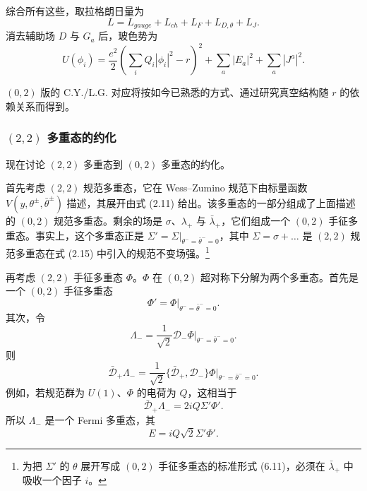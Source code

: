综合所有这些，取拉格朗日量为
\begin{equation}
L=L_{gauge}+L_{ch}+L_F+L_{D,\theta}+L_J.\tag{6.26}
\end{equation}
消去辅助场 $D$ 与 $G_a$ 后，玻色势为
\begin{equation} U(\phi_i)=\frac{e^2}{2}\left(\sum_iQ_i|\phi_i|^2-r\right)^2+\sum_a|E_a|^2+\sum_a|J^a|^2.\tag{6.27}
\end{equation}


$(0,2)$ 版的 C.Y./L.G. 对应将按如今已熟悉的方式、通过研究真空结构随 $r$ 的依赖关系而得到。

\subsubsection*{$(2,2)$ 多重态的约化}

现在讨论 $(2,2)$ 多重态到 $(0,2)$ 多重态的约化。

首先考虑 $(2,2)$ 规范多重态，它在 Wess--Zumino 规范下由标量函数 $V(y,\theta^\pm,\bar\theta^\pm)$ 描述，其展开由式 (2.11) 给出。该多重态的一部分组成了上面描述的 $(0,2)$ 规范多重态。剩余的场是 $\sigma$、$\lambda_+$ 与 $\bar\lambda_+$，它们组成一个 $(0,2)$ 手征多重态。事实上，这个多重态正是 $\Sigma'=\Sigma|_{\theta^-=\bar\theta^-=0}$，其中 $\Sigma=\sigma+\ldots$ 是 $(2,2)$ 规范多重态在式 (2.15) 中引入的规范不变场强。\footnote{为把 $\Sigma'$ 的 $\theta$ 展开写成 $(0,2)$ 手征多重态的标准形式 (6.11)，必须在 $\bar\lambda_+$ 中吸收一个因子 $i$。}

再考虑 $(2,2)$ 手征多重态 $\Phi$。$\Phi$ 在 $(0,2)$ 超对称下分解为两个多重态。首先是一个 $(0,2)$ 手征多重态
\begin{equation}
\Phi'=\Phi\big|_{\theta^-=\bar\theta^-=0}.\tag{6.28}
\end{equation}
\label{op:81}
其次，令
\begin{equation}
\Lambda_-=\frac{1}{\sqrt2}\mathcal{D}_-\Phi\big|_{\theta^-=\bar\theta^-=0}.\tag{6.29}
\end{equation}
则
\begin{equation}
\bar{\mathcal{D}}_+\Lambda_-=\frac{1}{\sqrt2}\{\bar{\mathcal{D}}_+,\mathcal{D}_-\}\Phi\big|_{\theta^-=\bar\theta^-=0}.\tag{6.30}
\end{equation}
例如，若规范群为 $U(1)$、$\Phi$ 的电荷为 $Q$，这相当于
\begin{equation}
\bar{\mathcal{D}}_+\Lambda_-=2iQ\Sigma'\Phi'.\tag{6.31}
\end{equation}
所以 $\Lambda_-$ 是一个 Fermi 多重态，其
\begin{equation}
E=iQ\sqrt2\Sigma'\Phi'.\tag{6.32}
\end{equation}

